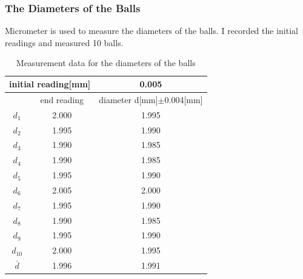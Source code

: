 \documentclass[12pt]{article}
\begin{document}
\subsubsection{The Diameters of the Balls}
Micrometer is used to measure the diameters of the balls. I recorded the initial readings and measured 10 balls.
\begin{table}[H]
\centering
\begin{tabular}{|c|c|c|}
\hline
\multicolumn{2}{|c|}{initial reading{[}mm{]}} & 0.005                           \\ \hline
                 & end reading                & diameter d{[}mm{]}$\pm$0.004{[}mm{]} \\ \hline
$d_1$                & 2.000                      & 1.995                           \\ \hline
$d_2$                & 1.995                      & 1.990                           \\ \hline
$d_3$                & 1.990                      & 1.985                           \\ \hline
$d_4$                & 1.990                      & 1.985                           \\ \hline
$d_5$                & 1.995                      & 1.990                           \\ \hline
$d_6$                & 2.005                      & 2.000                           \\ \hline
$d_7$                & 1.995                      & 1.990                           \\ \hline
$d_8$                & 1.990                      & 1.985                           \\ \hline
$d_9$                & 1.995                      & 1.990                           \\ \hline
$d_{10}$                & 2.000                      & 1.995                           \\ \hline
$\bar{d}$                & 1.996                      & 1.991                           \\ \hline
\end{tabular}
\caption{Measurement data for the diameters of the balls}
\end{table}
\end{document}
